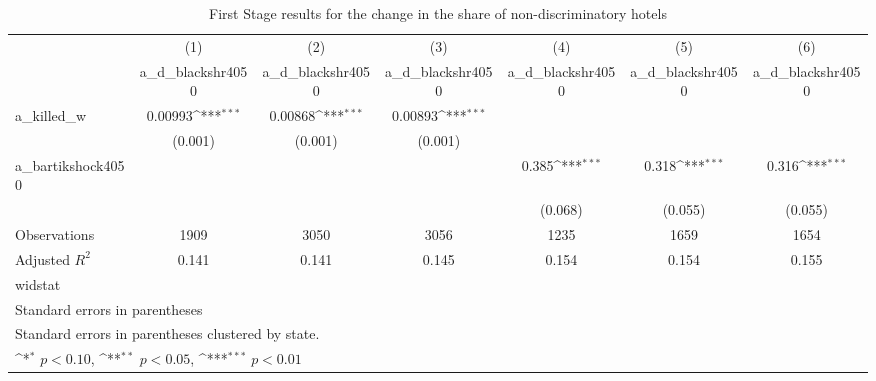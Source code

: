 \begin{table}[htbp]\centering
\def\sym#1{\ifmmode^{#1}\else\(^{#1}\)\fi}
\caption{First Stage results for the change in the share of non-discriminatory hotels}
\begin{tabular}{l*{6}{c}}
\hline\hline
                    &\multicolumn{1}{c}{(1)}&\multicolumn{1}{c}{(2)}&\multicolumn{1}{c}{(3)}&\multicolumn{1}{c}{(4)}&\multicolumn{1}{c}{(5)}&\multicolumn{1}{c}{(6)}\\
                    &\multicolumn{1}{c}{a\_d\_blackshr4050}&\multicolumn{1}{c}{a\_d\_blackshr4050}&\multicolumn{1}{c}{a\_d\_blackshr4050}&\multicolumn{1}{c}{a\_d\_blackshr4050}&\multicolumn{1}{c}{a\_d\_blackshr4050}&\multicolumn{1}{c}{a\_d\_blackshr4050}\\
\hline
a\_killed\_w          &     0.00993\sym{***}&     0.00868\sym{***}&     0.00893\sym{***}&                     &                     &                     \\
                    &     (0.001)         &     (0.001)         &     (0.001)         &                     &                     &                     \\
[1em]
a\_bartikshock4050   &                     &                     &                     &       0.385\sym{***}&       0.318\sym{***}&       0.316\sym{***}\\
                    &                     &                     &                     &     (0.068)         &     (0.055)         &     (0.055)         \\
\hline
Observations        &        1909         &        3050         &        3056         &        1235         &        1659         &        1654         \\
Adjusted \(R^{2}\)  &       0.141         &       0.141         &       0.145         &       0.154         &       0.154         &       0.155         \\
widstat             &                     &                     &                     &                     &                     &                     \\
\hline\hline
\multicolumn{7}{l}{\footnotesize Standard errors in parentheses}\\
\multicolumn{7}{l}{\footnotesize Standard errors in parentheses clustered by state.}\\
\multicolumn{7}{l}{\footnotesize \sym{*} \(p<0.10\), \sym{**} \(p<0.05\), \sym{***} \(p<0.01\)}\\
\end{tabular}
\end{table}
